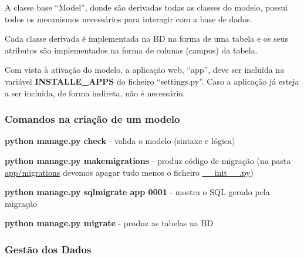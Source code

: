 \documentclass{article}
\begin{document}
\begin{flushleft}
  A classe base “Model”, donde são derivadas todas as
  classes do modelo, possui todos os mecanismos
  necessários para interagir com a base de dados.

  Cada classe derivada é implementada na BD na
  forma de uma tabela e os seus atributos são
  implementados na forma de colunas (campos) da
  tabela.

  Com vista à ativação do modelo, a aplicação web, “app”, deve
  ser incluída na variável \textbf{INSTALLE\_APPS} do ficheiro
  “settings.py”. Caso a aplicação já esteja a ser incluída, de
  forma indireta, não é necessário.
\end{flushleft}

\pagebreak

\subsubsection{Comandos na criação de um modelo}

\begin{flushleft}
  \textbf{python manage.py check} - valida o modelo (sintaxe e lógica)

  \textbf{python manage.py makemigrations} - produz código de migração (na
  pasta \uline{app/migrations} devemos apagar tudo menos o ficheiro \uline{\_\_init\_\_.py})
  
  \textbf{python manage.py sqlmigrate app 0001} - mostra o SQL gerado pela migração

  \textbf{python manage.py migrate} - produz as tabelas na BD
\end{flushleft}

\subsubsection{Gestão dos Dados}
\end{document}
